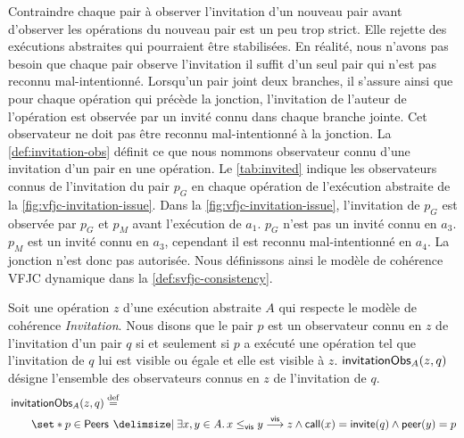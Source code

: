 Contraindre chaque pair à observer l'invitation d'un nouveau pair avant d'observer les opérations du nouveau pair est un peu trop strict.
Elle rejette des exécutions abstraites qui pourraient être stabilisées.
En réalité, nous n'avons pas besoin que chaque pair observe l'invitation il suffit d'un seul pair qui n'est pas reconnu mal-intentionné.
Lorsqu'un pair joint deux branches, il s'assure ainsi que pour chaque opération qui précède la jonction, l'invitation de l'auteur de l'opération est observée par un invité connu dans chaque branche jointe.
Cet observateur ne doit pas être reconnu mal-intentionné à la jonction.
La \autoref{def:invitation-obs} définit ce que nous nommons observateur connu d'une invitation d'un pair en une opération.
Le \autoref{tab:invited} indique les observateurs connus de l'invitation du pair $p_G$ en chaque opération de l'exécution abstraite de la \autoref{fig:vfjc-invitation-issue}.
Dans la \autoref{fig:vfjc-invitation-issue}, l'invitation de $p_G$ est observée par $p_G$ et $p_M$ avant l'exécution de $a_1$.
$p_G$ n'est pas un invité connu en $a_3$.
$p_M$ est un invité connu en $a_3$, cependant il est reconnu mal-intentionné en $a_4$.
La jonction n'est donc pas autorisée.
Nous définissons ainsi le modèle de cohérence \ac{VFJC} dynamique dans la \autoref{def:svfjc-consistency}.

\begin{definition}\label{def:invitation-obs}
Soit une opération $z$ d'une exécution abstraite $A$ qui respecte le modèle de cohérence \emph{Invitation}.
Nous disons que le pair $p$ est un observateur connu en $z$ de l'invitation d'un pair $q$ si et seulement si $p$ a exécuté une opération tel que l'invitation de $q$ lui est visible ou égale et elle est visible à $z$.
$\operatorname{\mathsf{invitationObs}}_A(z, q)$ désigne l'ensemble des observateurs connus en $z$ de l'invitation de $q$.
\begin{equation*}\begin{split}
    \MoveEqLeft\trm{invitationObs}_A(z, q) \defeq\\
    &\set*{p \in \trm{Peers} \given \exists x, y \in A \qsep x \viseq y \vis z \land \trm{call}(x) = \trm{invite}(q) \land \trm{peer}(y) = p}
\end{split}\end{equation*}
\end{definition}

